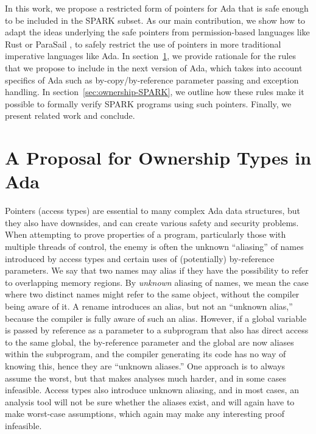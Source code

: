 \documentclass[runningheads]{llncs}
\begin{document}
In this work, we propose a restricted form of pointers for Ada that is safe enough to be included in the SPARK subset. As our main contribution, we show how to adapt the ideas underlying the safe pointers from permission-based languages like Rust \cite{Balasubramanian17} or ParaSail \cite{Taft11}, to safely restrict the use of pointers in more traditional imperative languages like Ada. In section~\ref{sec:ownership-Ada}, we provide rationale for the rules that we propose to include in the next version of Ada, which takes into account specifics of Ada such as by-copy/by-reference parameter passing and exception handling. In section~\ref{sec:ownership-SPARK}, we outline how these rules make it possible to formally verify SPARK programs using such pointers. Finally, we present related work and conclude.

\section{A Proposal for Ownership Types in Ada}
\label{sec:ownership-Ada}

Pointers (access types) are essential to many complex Ada data structures, but they also have downsides, and can create various safety and security problems.
When attempting to prove properties of a program, particularly those with multiple threads of control, the enemy is often the unknown ``aliasing'' of names introduced by
access types and certain uses of (potentially) by-reference parameters. We say that two names may alias if they have the possibility to refer to overlapping memory regions.
By \textit{unknown} aliasing of names, we mean the case where two distinct names might refer to the same object, without the compiler being aware of it.  A rename introduces
an alias, but not an ``unknown alias,'' because the compiler is fully aware of such an alias. However, if a global
variable is passed by reference as a parameter to a subprogram that also has direct access to the same global, the by-reference parameter and the global are now aliases within
the subprogram, and the compiler generating its code has no way of knowing this, hence they are ``unknown aliases.''  One approach is to always assume the worst,
but that makes analyses much harder, and in some cases infeasible. Access types also introduce unknown aliasing, and in most cases, an analysis tool will not be
sure whether the aliases exist, and will again have to make worst-case assumptions, which again may make any interesting proof infeasible.
\end{document}
